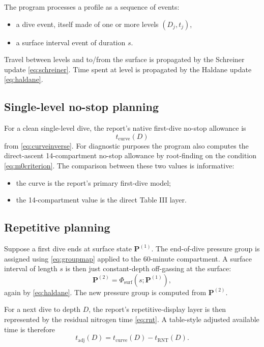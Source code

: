 \documentclass[11pt]{article}
\begin{document}
The program processes a profile as a sequence of events:
\begin{itemize}
\item a dive event, itself made of one or more levels $(D_j,t_j)$,
\item a surface interval event of duration $s$.
\end{itemize}

Travel between levels and to/from the surface is propagated by the Schreiner update \eqref{eq:schreiner}. Time spent at level is propagated by the Haldane update \eqref{eq:haldane}.

\subsection{Single-level no-stop planning}

For a clean single-level dive, the report's native first-dive no-stop allowance is
\[
t_{\mathrm{curve}}(D)
\]
from \eqref{eq:curveinverse}. For diagnostic purposes the program also computes the direct-ascent 14-compartment no-stop allowance by root-finding on the condition \eqref{eq:m0criterion}. The comparison between these two values is informative:
\begin{itemize}
\item the curve is the report's primary first-dive model;
\item the 14-compartment value is the direct Table III layer.
\end{itemize}

\subsection{Repetitive planning}

Suppose a first dive ends at surface state $\mathbf{P}^{(1)}$. The end-of-dive pressure group is assigned using \eqref{eq:groupmap} applied to the 60-minute compartment. A surface interval of length $s$ is then just constant-depth off-gassing at the surface:
\[
\mathbf{P}^{(2)} = \Phi_{\mathrm{surf}}(s;\mathbf{P}^{(1)}),
\]
again by \eqref{eq:haldane}. The new pressure group is computed from $\mathbf{P}^{(2)}$.

For a next dive to depth $D$, the report's repetitive-display layer is then represented by the residual nitrogen time \eqref{eq:rnt}. A table-style adjusted available time is therefore
\begin{equation}
t_{\mathrm{adj}}(D)
=
t_{\mathrm{curve}}(D)-t_{\mathrm{RNT}}(D).
\label{eq:adjusted}
\end{equation}
\end{document}
